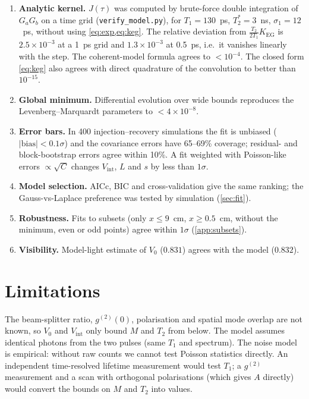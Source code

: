 \documentclass{article}
\newcommand{\Kg}{K_{\mathrm{EG}}}
\newcommand{\Vi}{V_{\mathrm{int}}}
\begin{document}
\begin{enumerate}
\item \textbf{Analytic kernel.} $J(\tau)$ was computed by brute-force
double integration of $G_a G_b$ on a time grid (\texttt{verify\_model.py}),
for $T_1=130$~ps, $T_2^*=3$~ns, $\sigma_1=12$~ps, without using
\cref{eq:exp,eq:keg}. The relative deviation from $\frac{T_2}{2T_1}\Kg$ is
$2.5\times10^{-3}$ at a 1~ps grid and $1.3\times10^{-3}$ at 0.5~ps, i.e.\ it
vanishes linearly with the step. The coherent-model formula agrees to
$<10^{-4}$. The closed form \cref{eq:keg} also agrees with direct quadrature
of the convolution to better than $10^{-15}$.
\item \textbf{Global minimum.} Differential evolution over wide bounds
reproduces the Levenberg--Marquardt parameters to $<4\times10^{-8}$.
\item \textbf{Error bars.} In 400 injection--recovery simulations the fit is
unbiased ($|\mathrm{bias}|<0.1\sigma$) and the covariance errors have
65--69\% coverage; residual- and block-bootstrap errors agree within 10\%. A
fit weighted with Poisson-like errors $\propto\sqrt{C}$ changes $\Vi$, $L$
and $s$ by less than $1\sigma$.
\item \textbf{Model selection.} AICc, BIC and cross-validation give the same
ranking; the Gauss-vs-Laplace preference was tested by simulation
(\cref{sec:fit}).
\item \textbf{Robustness.} Fits to subsets (only $x\le9$~cm, $x\ge0.5$~cm,
without the minimum, even or odd points) agree within $1\sigma$
(\cref{app:subsets}).
\item \textbf{Visibility.} Model-light estimate of $V_0$ ($0.831$) agrees
with the model ($0.832$).
\end{enumerate}

\section{Limitations}

The beam-splitter ratio, $g^{(2)}(0)$, polarisation and spatial mode overlap
are not known, so $V_0$ and $\Vi$ only bound $M$ and $T_2$ from below. The
model assumes identical photons from the two pulses (same $T_1$ and
spectrum). The noise model is empirical: without raw counts we cannot test
Poisson statistics directly. An independent time-resolved lifetime
measurement would test $T_1$; a $g^{(2)}$ measurement and a scan with
orthogonal polarisations (which gives $A$ directly) would convert the bounds
on $M$ and $T_2$ into values.
\end{document}
